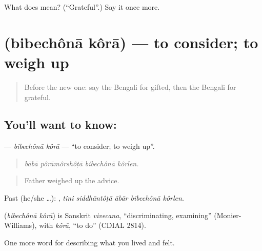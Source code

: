 \begin{tcolorbox}[breakable,colback=teal!4,colframe=teal!35!black,title={Before you move on}]
What does  mean? (\textquotedblleft{}Grateful\textquotedblright{}.) Say it once more.
\end{tcolorbox}
\section[\texorpdfstring{\bn{বিবেচনা} \bn{করা} (bibechônā kôrā)}{বিবেচনা করা (bibechônā kôrā)}]{  (bibechônā kôrā) — to consider; to weigh up}

\label{lesson:BN-C465-bibechona-kora}



\begin{quote}
Before the new one: say the Bengali for gifted, then the Bengali for grateful.
\end{quote}

\subsection*{You'll want to know:  }
\textbf{ } — \emph{bibechônā kôrā} — \textquotedblleft{}to consider; to weigh up\textquotedblright{}.

\begin{quote}
   
\end{quote}

\begin{quote}
\emph{bābā pôrāmôrshôṭā bibechônā kôrlen.}
\end{quote}

\begin{quote}
Father weighed up the advice.
\end{quote}

Past (he/she …):     , \emph{tini siddhāntôṭā ābār bibechônā kôrlen}.

\begin{cousinweb}
\textbf{ } (\emph{bibechônā kôrā}) is Sanskrit \emph{vivecana}, \textquotedblleft{}discriminating, examining\textquotedblright{} (Monier-Williams), with \emph{kôrā}, \textquotedblleft{}to do\textquotedblright{} (CDIAL 2814).
\end{cousinweb}

\begin{grammarlens}[title={What you've built}]
One more word for describing what you lived and felt.
\end{grammarlens}

